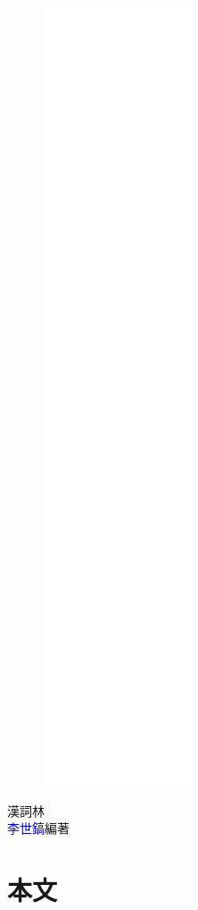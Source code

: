 \documentclass[a5paper,10pt]{book}
\begin{document}
\frontmatter
\linespread{1.25}
\begin{figure}
\includegraphics[height=230mm]{cover.png}
\end{figure}
\hfill
\vfill
{\Huge\textcolor{deepblue}{漢詞林}}\\
{\textcolor{blue}{李世鎬}\hspace{14pt}編著}
\vspace{64pt}
\newpage
\addtolength{\topmargin}{20mm}
\mainmatter
\linespread{1.25}


\chapter*{本文}
\begin{multicols}{3}

\end{multicols}

\appendix
{\selectfont\printbibliography{}}
\end{document}
